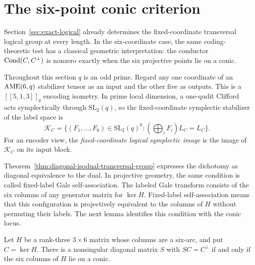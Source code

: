 \section{The six-point conic criterion}
\label{sec:logical}

Section~\ref{sec:exact-logical} already determines the fixed-coordinate
transversal logical group at every length.  In the six-coordinate case, the
same coding-theoretic test has a classical geometric interpretation: the
conductor \(\operatorname{Cond}(C,C^\perp)\) is nonzero exactly when the six projective
points lie on a conic.

Throughout this section \(q\) is an odd prime.  Regard any one coordinate of
an \(\mathrm{AME}(6,q)\) stabilizer tensor as an input and the other five as outputs.
This is a \([[5,1,3]]_q\) encoding isometry.  In prime local dimension, a
one-qudit Clifford acts symplectically through \(\mathrm{SL}_2(q)\), so the
fixed-coordinate symplectic stabilizer of the label space is
\[
 \mathcal K_C=\{(F_1,\ldots,F_6)\in\mathrm{SL}_2(q)^6:
                 (\bigoplus_iF_i)L_C=L_C\}.
\]
For an encoder view, the \emph{fixed-coordinate logical symplectic image} is
the image of \(\mathcal K_C\) on its input block.

Theorem~\ref{thm:diagonal-isodual-transversal-group} expresses the dichotomy
as diagonal equivalence to the dual.  In projective geometry, the same
condition is called fixed-label Gale self-association.  The labeled Gale
transform consists of the six columns of any generator matrix for \(\ker H\).
Fixed-label self-association means that this configuration is projectively
equivalent to the columns of \(H\) without permuting their labels.  The next
lemma identifies this condition with the conic locus.

\begin{lemma}
\label{lem:six-arc-self-association}
Let \(H\) be a rank-three \(3\times6\) matrix whose columns are a six-arc,
and put \(C=\ker H\).  There is a nonsingular diagonal matrix \(S\) with
\(SC=C^\perp\) if and only if the six columns of \(H\) lie on a conic.
\end{lemma}

